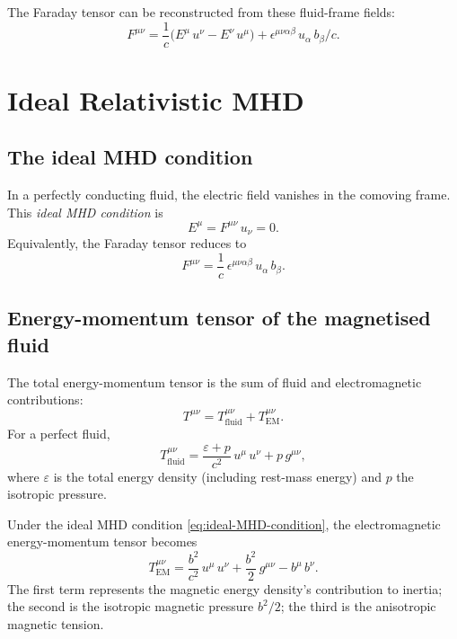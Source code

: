 The Faraday tensor can be reconstructed from these fluid-frame fields:
\begin{equation}
  F^{\mu\nu}
  = \frac{1}{c}\bigl(E^{\mu}\,u^{\nu} - E^{\nu}\,u^{\mu}\bigr)
  + \epsilon^{\mu\nu\alpha\beta}\,u_{\alpha}\,b_{\beta}/c.
  \label{eq:Fmunu-decomp}
\end{equation}


\section{Ideal Relativistic MHD}
\label{sec:ideal-rmhd}

\subsection{The ideal MHD condition}

In a perfectly conducting fluid, the electric field vanishes in the
comoving frame.  This \emph{ideal MHD condition} is
\begin{equation}
  E^{\mu} = F^{\mu\nu}\,u_{\nu} = 0.
  \label{eq:ideal-MHD-condition}
\end{equation}
Equivalently, the Faraday tensor reduces to
\begin{equation}
  F^{\mu\nu} = \frac{1}{c}\,\epsilon^{\mu\nu\alpha\beta}\,u_{\alpha}\,b_{\beta}.
  \label{eq:F-ideal}
\end{equation}

\subsection{Energy-momentum tensor of the magnetised fluid}

The total energy-momentum tensor is the sum of fluid and electromagnetic
contributions:
\begin{equation}
  T^{\mu\nu} = T^{\mu\nu}_{\mathrm{fluid}} + T^{\mu\nu}_{\mathrm{EM}}.
  \label{eq:Tmunu-total}
\end{equation}
For a perfect fluid,
\begin{equation}
  T^{\mu\nu}_{\mathrm{fluid}}
  = \frac{\varepsilon + p}{c^{2}}\,u^{\mu}\,u^{\nu} + p\,g^{\mu\nu},
  \label{eq:Tmunu-fluid}
\end{equation}
where $\varepsilon$ is the total energy density (including rest-mass
energy) and $p$ the isotropic pressure.

Under the ideal MHD condition \eqref{eq:ideal-MHD-condition}, the
electromagnetic energy-momentum tensor becomes
\begin{equation}
  T^{\mu\nu}_{\mathrm{EM}}
  = \frac{b^{2}}{c^{2}}\,u^{\mu}\,u^{\nu}
  + \frac{b^{2}}{2}\,g^{\mu\nu}
  - b^{\mu}\,b^{\nu}.
  \label{eq:Tmunu-EM}
\end{equation}
The first term represents the magnetic energy density's contribution to
inertia; the second is the isotropic magnetic pressure $b^{2}/2$; the
third is the anisotropic magnetic tension.

